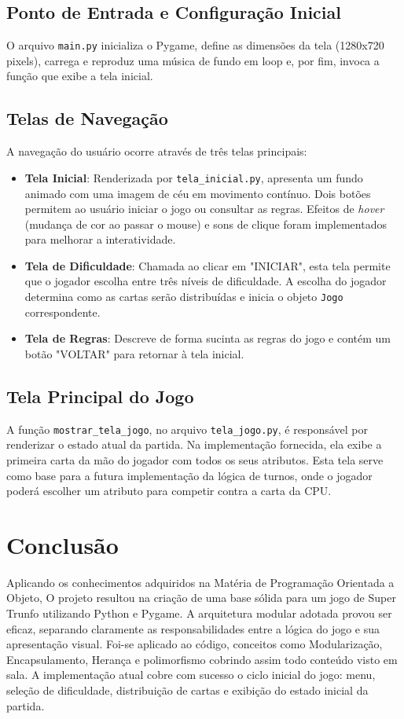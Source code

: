 \documentclass[a4paper, twocolumn]{article}
\begin{document}
\subsection{Ponto de Entrada e Configuração Inicial}
O arquivo \texttt{main.py} inicializa o Pygame, define as dimensões da tela (1280x720 pixels), carrega e reproduz uma música de fundo em loop e, por fim, invoca a função que exibe a tela inicial.

\subsection{Telas de Navegação}
A navegação do usuário ocorre através de três telas principais:
\begin{itemize}
    \item \textbf{Tela Inicial}: Renderizada por \texttt{tela\_inicial.py}, apresenta um fundo animado com uma imagem de céu em movimento contínuo. Dois botões permitem ao usuário iniciar o jogo ou consultar as regras. Efeitos de \textit{hover} (mudança de cor ao passar o mouse) e sons de clique foram implementados para melhorar a interatividade.
    
    \item \textbf{Tela de Dificuldade}: Chamada ao clicar em "INICIAR", esta tela permite que o jogador escolha entre três níveis de dificuldade. A escolha do jogador determina como as cartas serão distribuídas e inicia o objeto \texttt{Jogo} correspondente.
    
    \item \textbf{Tela de Regras}: Descreve de forma sucinta as regras do jogo e contém um botão "VOLTAR" para retornar à tela inicial.
\end{itemize}

\subsection{Tela Principal do Jogo}
A função \texttt{mostrar\_tela\_jogo}, no arquivo \texttt{tela\_jogo.py}, é responsável por renderizar o estado atual da partida. Na implementação fornecida, ela exibe a primeira carta da mão do jogador com todos os seus atributos. Esta tela serve como base para a futura implementação da lógica de turnos, onde o jogador poderá escolher um atributo para competir contra a carta da CPU.

\section{Conclusão}
Aplicando os conhecimentos adquiridos na Matéria de Programação Orientada a Objeto, O projeto resultou na criação de uma base sólida  para um jogo de Super Trunfo utilizando Python e Pygame. A arquitetura modular adotada provou ser eficaz, separando claramente as responsabilidades entre a lógica do jogo e sua apresentação visual. Foi-se aplicado ao código, conceitos como Modularização, Encapsulamento, Herança e polimorfismo cobrindo assim todo conteúdo visto em sala. A implementação atual cobre com sucesso o ciclo inicial do jogo: menu, seleção de dificuldade, distribuição de cartas e exibição do estado inicial da partida.
\end{document}
